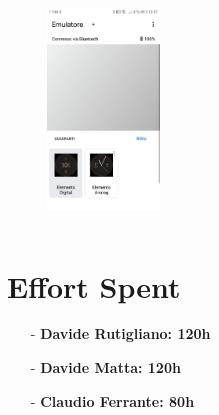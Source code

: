 \documentclass[a4paper]{article}
\begin{document}
\begin{itemize}
\begin{figure}[!htpb]
    \includegraphics[width=30mm, height=60mm]{ITD/images/wearos4.jpeg}
    \end{figure}
\end{itemize}

\newpage
\section{Effort Spent}
    \begin{itemize}
        \item[-] \textbf{Davide Rutigliano: 120h}
        
        \item[-] \textbf{Davide Matta: 120h}
        
        \item[-] \textbf{Claudio Ferrante: 80h}
    \end{itemize}
\end{document}
